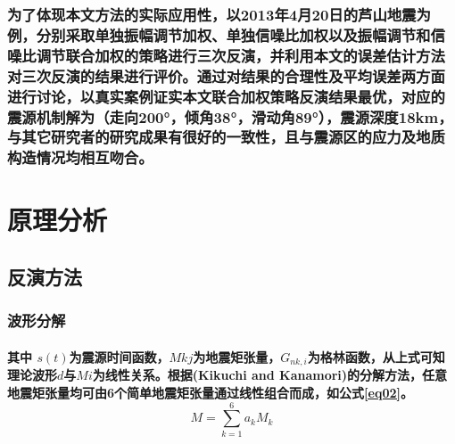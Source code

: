 \documentclass[a4paper,12pt,single,pdftex]{scrartcl}
\begin{document}
\label{ID_1381199343}\subsubsection{为了体现本文方法的实际应用性，以2013年4月20日的芦山地震为例，分别采取单独振幅调节加权、单独信噪比加权以及振幅调节和信噪比调节联合加权的策略进行三次反演，并利用本文的误差估计方法对三次反演的结果进行评价。通过对结果的合理性及平均误差两方面进行讨论，以真实案例证实本文联合加权策略反演结果最优，对应的震源机制解为（走向200°，倾角38°，滑动角89°），震源深度18km，与其它研究者的研究成果有很好的一致性，且与震源区的应力及地质构造情况均相互吻合。}

\label{ID_64212303}\section{原理分析}

\label{ID_1219588045}\subsection{反演方法}

\label{ID_1243921566}\subsubsection{波形分解}

\label{ID_1903486780}\paragraph{}

\label{ID_1523655541}\paragraph{其中 $s(t)$为震源时间函数，$Mkj$为地震矩张量，$G_{nk,i}$为格林函数，从上式可知理论波形$d$与$Mi$为线性关系。根据(Kikuchi and Kanamori)的分解方法，任意地震矩张量均可由6个简单地震矩张量通过线性组合而成，如公式\ref{eq02}。
\begin{equation}
\label{eq02}
M=\sum_{k=1}^6a_kM_k
\end{equation}}
\end{document}
